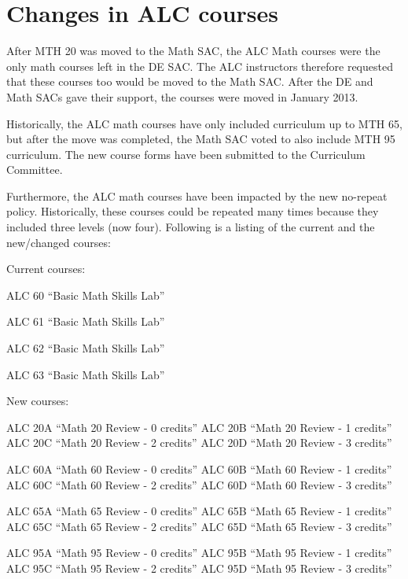 \chapter{Changes in ALC courses}\label{app:sec:alc}
After MTH 20 was moved to the Math SAC, the ALC Math courses were the only math courses left in the DE SAC. The ALC instructors therefore requested that these courses too would be moved to the Math SAC. After the DE and Math SACs gave their support, the courses were moved in January 2013.

Historically, the ALC math courses have only included curriculum up to MTH 65, but after the move was completed, the Math SAC voted to also include MTH 95 curriculum. The new course forms have been submitted to the Curriculum Committee.

Furthermore, the ALC math courses have been impacted by the new no-repeat policy. Historically, these courses could be repeated many times because they included three levels (now four). Following is a listing  of the current and the new/changed courses:

Current courses:

ALC 60 ``Basic Math Skills Lab''

ALC 61 ``Basic Math Skills Lab''

ALC 62 ``Basic Math Skills Lab''

ALC 63 ``Basic Math Skills Lab''

New courses:

ALC 20A ``Math 20 Review - 0 credits''
ALC 20B ``Math 20 Review - 1 credits''
ALC 20C ``Math 20 Review - 2 credits''
ALC 20D ``Math 20 Review - 3 credits''

ALC 60A ``Math 60 Review - 0 credits''
ALC 60B ``Math 60 Review - 1 credits''
ALC 60C ``Math 60 Review - 2 credits''
ALC 60D ``Math 60 Review - 3 credits''

ALC 65A ``Math 65 Review - 0 credits''
ALC 65B ``Math 65 Review - 1 credits''
ALC 65C ``Math 65 Review - 2 credits''
ALC 65D ``Math 65 Review - 3 credits''

ALC 95A ``Math 95 Review - 0 credits''
ALC 95B ``Math 95 Review - 1 credits''
ALC 95C ``Math 95 Review - 2 credits''
ALC 95D ``Math 95 Review - 3 credits''
